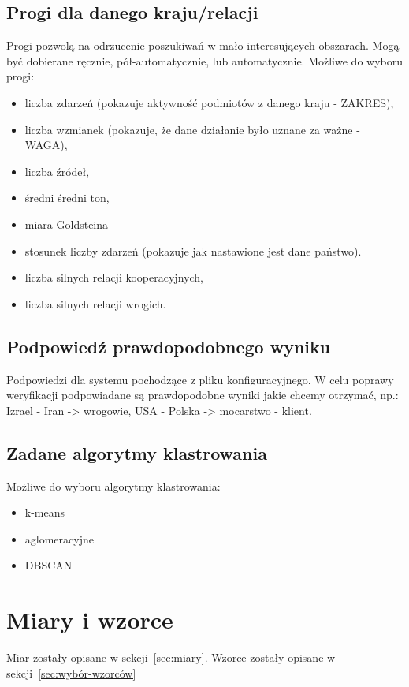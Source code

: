 \documentclass[11pt]{report}
\begin{document}
    \subsection{Progi dla danego kraju/relacji}\label{subsec:progi-dla-danego-kraju/relacji}
    Progi pozwolą na odrzucenie poszukiwań w mało interesujących obszarach.
    Mogą być dobierane ręcznie, pół-automatycznie, lub automatycznie.
    Możliwe do wyboru progi:
    \begin{itemize}
        \item liczba zdarzeń (pokazuje aktywność podmiotów z danego kraju - ZAKRES),
        \item liczba wzmianek (pokazuje, że dane działanie było uznane za ważne - WAGA),
        \item liczba źródeł,
        \item średni średni ton,
        \item miara Goldsteina
        \item stosunek liczby zdarzeń (pokazuje jak nastawione jest dane państwo).
        \item liczba silnych relacji kooperacyjnych,
        \item liczba silnych relacji wrogich.
    \end{itemize}

    \subsection{Podpowiedź prawdopodobnego wyniku}\label{subsec:podpowiedź-prawdopodobnego-wyniku}
    Podpowiedzi dla systemu pochodzące z pliku konfiguracyjnego.
    W celu poprawy weryfikacji podpowiadane są prawdopodobne wyniki jakie chcemy otrzymać,
    np.: Izrael - Iran -> wrogowie, USA - Polska -> mocarstwo - klient.

    \subsection{Zadane algorytmy klastrowania}
    Możliwe do wyboru algorytmy klastrowania:
    \begin{itemize}
        \item k-means
        \item aglomeracyjne
        \item DBSCAN
    \end{itemize}


    \section{Miary i wzorce}
    Miar zostały opisane w sekcji~\ref{sec:miary}.
    Wzorce zostały opisane w sekcji~\ref{sec:wybór-wzorców}
\end{document}
